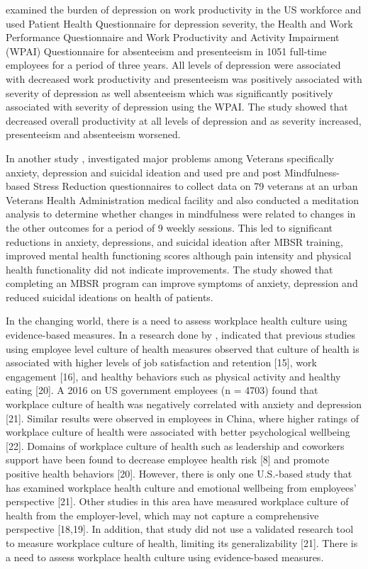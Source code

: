 \documentclass{beamer}
\begin{document}
\begin{frame}
	 \cite{jain2013patient} examined the burden of depression on work productivity in the US workforce and used Patient Health Questionnaire for depression severity, the Health and Work Performance Questionnaire and Work Productivity and Activity Impairment (WPAI) Questionnaire for absenteeism and presenteeism in 1051 full-time employees for a period of three years. All levels of depression were associated with decreased work productivity and presenteeism was positively associated with severity of depression as well absenteeism which was significantly positively associated with severity of depression using the WPAI. The study showed that decreased overall productivity at all levels of depression and as severity increased, presenteeism and absenteeism worsened.
\end{frame}
\begin{frame}
	In another study \cite{serpa2014mindfulness}, investigated major problems among Veterans specifically anxiety, depression and suicidal ideation and used pre and post Mindfulness-based Stress Reduction questionnaires to collect data on 79 veterans at an urban Veterans Health Administration medical facility and also conducted a meditation analysis to determine whether changes in mindfulness were related to changes in the other outcomes for a period of 9 weekly sessions. This led to significant reductions in anxiety, depressions, and suicidal ideation after MBSR training, improved mental health functioning scores although pain intensity and physical health functionality did not indicate improvements. The study showed that completing an MBSR program can improve symptoms of anxiety, depression and reduced suicidal ideations on health of patients.
\end{frame}
\begin{frame}
	In the changing world, there is a need to assess workplace health culture using evidence-based measures. In a research done by \cite{laing2016anxiety}, indicated that previous studies using employee level culture of health measures observed that culture of health is associated with higher levels of job satisfaction and retention [15], work engagement [16], and healthy behaviors such as physical activity and healthy eating [20]. A 2016 on US government employees (n = 4703) found that workplace culture of health was negatively correlated with anxiety and depression [21]. Similar results were observed in employees in China, where higher ratings of workplace culture of health were associated with better psychological wellbeing [22]. 
	Domains of workplace culture of health such as leadership and coworkers support have been found to decrease employee health risk [8] and promote positive health behaviors [20]. However, there is only one U.S.-based study that has examined workplace health culture and emotional wellbeing from employees' perspective [21].  Other studies in this area have measured workplace culture of health from the employer-level, which may not capture a comprehensive perspective [18,19]. In addition, that study did not use a validated research tool to measure workplace culture of health, limiting its generalizability [21]. There is a need to assess workplace health culture using evidence-based measures. 
\end{frame}
\end{document}
